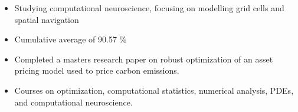 \documentclass[10pt,a4paper,ragged2e]{altacv}
\begin{document}

\begin{fullwidth}
\makecvheader
\end{fullwidth}




\begin{itemize}
\item Studying computational neuroscience, focusing on modelling grid cells and spatial navigation  
\end{itemize}

\divider

\begin{itemize}
\item Cumulative average of 90.57 \% 
\item Completed a masters research paper on robust optimization of an asset pricing model used to price carbon emissions.
\item Courses on optimization, computational statistics, numerical analysis, PDEs, and computational neuroscience.
\end{itemize}
\end{document}

